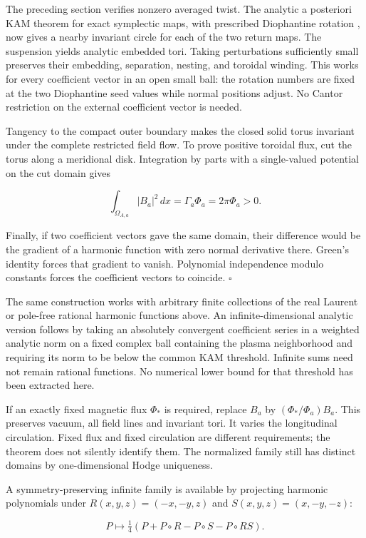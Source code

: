 The preceding section verifies nonzero averaged twist. The analytic a posteriori KAM theorem for exact symplectic maps, with prescribed Diophantine rotation \cite{dlL}, now gives a nearby invariant circle for each of the two return maps. The suspension yields analytic embedded tori. Taking perturbations sufficiently small preserves their embedding, separation, nesting, and toroidal winding. This works for every coefficient vector in an open small ball: the rotation numbers are fixed at the two Diophantine seed values while normal positions adjust. No Cantor restriction on the external coefficient vector is needed.

Tangency to the compact outer boundary makes the closed solid torus invariant under the complete restricted field flow. To prove positive toroidal flux, cut the torus along a meridional disk. Integration by parts with a single-valued potential on the cut domain gives

\[
\int_{\Omega_{A,a}}|B_a|^2\,dx=\Gamma_a\Phi_a=2\pi\Phi_a>0.
\]

Finally, if two coefficient vectors gave the same domain, their difference would be the gradient of a harmonic function with zero normal derivative there. Green's identity forces that gradient to vanish. Polynomial independence modulo constants forces the coefficient vectors to coincide. \(\square\)

The same construction works with arbitrary finite collections of the real Laurent or pole-free rational harmonic functions above. An infinite-dimensional analytic version follows by taking an absolutely convergent coefficient series in a weighted analytic norm on a fixed complex ball containing the plasma neighborhood and requiring its norm to be below the common KAM threshold. Infinite sums need not remain rational functions. No numerical lower bound for that threshold has been extracted here.

If an exactly fixed magnetic flux \(\Phi_*\) is required, replace \(B_a\) by \((\Phi_*/\Phi_a)B_a\). This preserves vacuum, all field lines and invariant tori. It varies the longitudinal circulation. Fixed flux and fixed circulation are different requirements; the theorem does not silently identify them. The normalized family still has distinct domains by one-dimensional Hodge uniqueness.

A symmetry-preserving infinite family is available by projecting harmonic polynomials under \(R(x,y,z)=(-x,-y,z)\) and \(S(x,y,z)=(x,-y,-z)\):

\[
P\mapsto\tfrac14(P+P\circ R-P\circ S-P\circ RS).
\]

